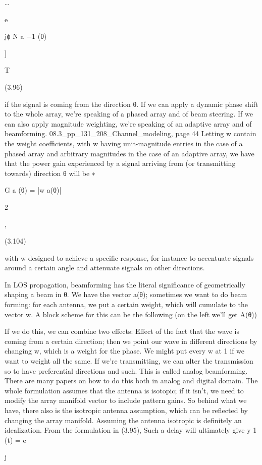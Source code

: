 {{{{…

e

jϕ N a −1 (θ)

]

T

(3.96)

if the signal is coming from the direction θ.
If we can apply a dynamic phase shift to the whole array, we're speaking of a phased array and of beam steering.
If we can also apply magnitude weighting, we're speaking of an adaptive array and of beamforming.
08.3_pp_131_208_Channel_modeling, page 44 Letting w contain the weight coefficients, with w having unit-magnitude entries in the case of a phased array and arbitrary magnitudes in the case of an adaptive array, we have that the power gain experienced by a signal arriving from (or transmitting towards) direction θ will be
∗

G a (θ) = |w a(θ)|

2

,

(3.104)

with w designed to achieve a specific response, for instance to accentuate signals around a certain angle and attenuate signals on other directions.

In LOS propagation, beamforming has the literal significance of geometrically shaping a beam in θ.
We have the vector a(θ); sometimes we want to do beam forming: for each antenna, we put a certain weight, which will cumulate to the vector w. A block scheme for this can be the following (on the left we'll get A(θ))

If we do this, we can combine two effects:
Effect of the fact that the wave is coming from a certain direction; then we point our wave in different directions by changing w, which is a weight for the phase. We might put every w at 1 if we want to weight all the same.
If we're transmitting, we can alter the transmission so to have preferential directions and such.
This is called analog beamforming. There are many papers on how to do this both in analog and digital domain.
The whole formulation assumes that the antenna is isotopic; if it isn't, we need to modify the array manifold vector to include pattern gains. So behind what we have,
there also is the isotropic antenna assumption, which can be reflected by changing the array manifold.
Assuming the antenna isotropic is definitely an idealization.
From the formulation in (3.95),
Such a delay will ultimately give y 1 (t) = e

j

}}}}
